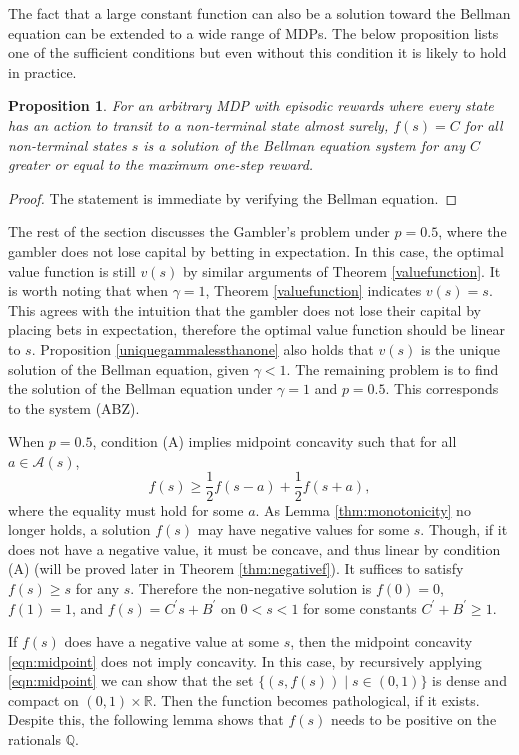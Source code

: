 \documentclass{article}
\newtheorem{proposition}[theorem]{Proposition}
\theoremstyle{named}
\newcommand{\RR}{\mathbb{R}}
\newcommand{\QQ}{\mathbb{Q}}
\newcommand{\cA}{\mathcal{A}}
\begin{document}
The fact that a large constant function can also be a solution toward the Bellman equation can be extended to a wide range of MDPs. The below proposition lists one of the sufficient conditions but even without this condition it is likely to hold in practice.

\begin{proposition}
For an arbitrary MDP with episodic rewards where every state has an action to transit to a non-terminal state almost surely, $f(s)=C$ for all non-terminal states $s$ is a solution of the Bellman equation system for any $C$ greater or equal to the maximum one-step reward.
\end{proposition}

\begin{proof}
The statement is immediate by verifying the Bellman equation.
\end{proof}

The rest of the section discusses the Gambler's problem under $p=0.5$, where the gambler does not lose capital by betting in expectation. In this case, the optimal value function is still $v(s)$ by similar arguments of Theorem \ref{valuefunction}. It is worth noting that when $\gamma=1$, Theorem \ref{valuefunction} indicates $v(s)=s$. This agrees with the intuition that the gambler does not lose their capital by placing bets in expectation, therefore the optimal value function should be linear to $s$. 
Proposition \ref{uniquegammalessthanone} also holds that $v(s)$ is the unique solution of the Bellman equation, given $\gamma<1$.
The remaining problem is to find the solution of the Bellman equation under $\gamma=1$ and $p=0.5$. This corresponds to the system ({ABZ}).

When $p=0.5$, condition ({A}) implies midpoint concavity such that for all $a\in \cA(s)$,
\begin{equation}
\label{eqn:midpoint}
f(s) \geq \frac{1}{2} f(s-a) + \frac{1}{2} f(s+a),
\end{equation}
where the equality must hold for some $a$.
As Lemma \ref{thm:monotonicity} no longer holds, a solution $f(s)$ may have negative values for some $s$. Though, if it does not have a negative value, it must be concave, and thus linear by condition ({A}) (will be proved later in Theorem \ref{thm:negativef}). It suffices to satisfy $f(s)\geq s$ for any $s$. Therefore the non-negative solution is $f(0)=0$, $f(1)=1$, and $f(s)=C^\prime s+B^\prime$ on $0<s<1$ for some constants $C^\prime+B^\prime \geq 1$.

If $f(s)$ does have a negative value at some $s$, then the midpoint concavity \eqref{eqn:midpoint} does not imply concavity.
In this case, by recursively applying \eqref{eqn:midpoint} we can show that the set $\{(s, f(s))\mid s\in (0,1)\}$ is dense and compact on $(0,1)\times \RR$. Then the function becomes pathological, if it exists. Despite this, the following lemma shows that $f(s)$ needs to be positive on the rationals $\QQ$.
\end{document}
